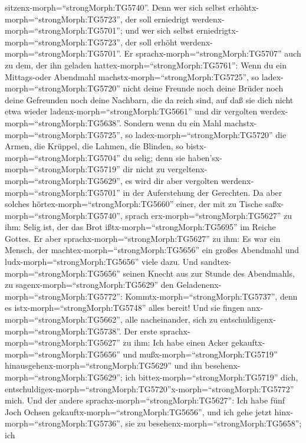 sitzenx-morph=``strongMorph:TG5740''.  Denn wer sich selbst
erhöhtx-morph=``strongMorph:TG5723'', der soll erniedrigt
werdenx-morph=``strongMorph:TG5701''; und wer sich selbst
erniedrigtx-morph=``strongMorph:TG5723'', der soll erhöht
werdenx-morph=``strongMorph:TG5701''.  Er
sprachx-morph=``strongMorph:TG5707'' auch zu dem, der ihn geladen
hattex-morph=``strongMorph:TG5761'': Wenn du ein Mittags-oder Abendmahl
machstx-morph=``strongMorph:TG5725'', so
ladex-morph=``strongMorph:TG5720'' nicht deine Freunde noch deine Brüder
noch deine Gefreunden noch deine Nachbarn, die da reich sind, auf daß
sie dich nicht etwa wieder ladenx-morph=``strongMorph:TG5661'' und dir
vergolten werdex-morph=``strongMorph:TG5638''.  Sondern
wenn du ein Mahl machstx-morph=``strongMorph:TG5725'', so
ladex-morph=``strongMorph:TG5720'' die Armen, die Krüppel, die Lahmen,
die Blinden,  so bistx-morph=``strongMorph:TG5704'' du
selig; denn sie haben'sx-morph=``strongMorph:TG5719'' dir nicht zu
vergeltenx-morph=``strongMorph:TG5629'', es wird dir aber vergolten
werdenx-morph=``strongMorph:TG5701'' in der Auferstehung der Gerechten.
 Da aber solches hörtex-morph=``strongMorph:TG5660'' einer,
der mit zu Tische saßx-morph=``strongMorph:TG5740'', sprach
erx-morph=``strongMorph:TG5627'' zu ihm: Selig ist, der das Brot
ißtx-morph=``strongMorph:TG5695'' im Reiche Gottes.  Er
aber sprachx-morph=``strongMorph:TG5627'' zu ihm: Es war ein Mensch, der
machtex-morph=``strongMorph:TG5656'' ein großes Abendmahl und
ludx-morph=``strongMorph:TG5656'' viele dazu.  Und
sandtex-morph=``strongMorph:TG5656'' seinen Knecht aus zur Stunde des
Abendmahls, zu sagenx-morph=``strongMorph:TG5629'' den
Geladenenx-morph=``strongMorph:TG5772'':
Kommtx-morph=``strongMorph:TG5737'', denn es
istx-morph=``strongMorph:TG5748'' alles bereit!  Und sie
fingen anx-morph=``strongMorph:TG5662'', alle nacheinander, sich zu
entschuldigenx-morph=``strongMorph:TG5738''. Der erste
sprachx-morph=``strongMorph:TG5627'' zu ihm: Ich habe einen Acker
gekauftx-morph=``strongMorph:TG5656'' und
mußx-morph=``strongMorph:TG5719''
hinausgehenx-morph=``strongMorph:TG5629'' und ihn
besehenx-morph=``strongMorph:TG5629''; ich
bittex-morph=``strongMorph:TG5719'' dich,
entschuldigex-morph=``strongMorph:TG5720''x-morph=``strongMorph:TG5772''
mich.  Und der andere sprachx-morph=``strongMorph:TG5627'':
Ich habe fünf Joch Ochsen gekauftx-morph=``strongMorph:TG5656'', und ich
gehe jetzt hinx-morph=``strongMorph:TG5736'', sie zu
besehenx-morph=``strongMorph:TG5658''; ich
